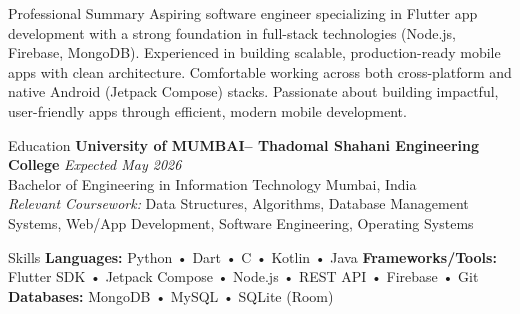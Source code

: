 \documentclass[10pt]{resume}
\begin{document}

\begin{rSection}{Professional Summary}
Aspiring software engineer specializing in Flutter app development with a strong foundation in full-stack technologies (Node.js, Firebase, MongoDB). Experienced in building scalable, production-ready mobile apps with clean architecture. Comfortable working across both cross-platform and native Android (Jetpack Compose) stacks. Passionate about building impactful, user-friendly apps through efficient, modern mobile development.

\end{rSection}


\begin{rSection}{Education}
\textbf{University of MUMBAI– Thadomal Shahani Engineering College} \hfill \textit{Expected May 2026} \\
Bachelor of Engineering in Information Technology \hfill Mumbai, India \\
\textit{Relevant Coursework:} Data Structures, Algorithms, Database Management Systems, Web/App Development, Software Engineering, Operating Systems
\end{rSection}



\begin{rSection}{Skills}
\textbf{Languages:} Python • Dart • C • Kotlin • Java \quad
\textbf{Frameworks/Tools:} Flutter SDK • Jetpack Compose • Node.js • REST API • Firebase • Git \quad
\textbf{Databases:} MongoDB • MySQL • SQLite (Room)
\end{rSection}
\end{document}
